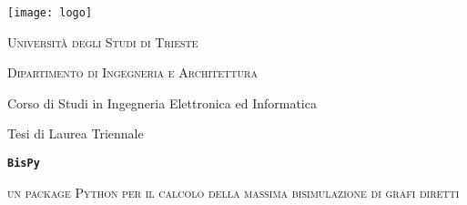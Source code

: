 \documentclass[11pt]{article}
\begin{document}
\begin{titlepage}
  \begin{center}
      \vspace{-2cm}
      \texttt{[image: logo]}

      \vspace{1.5cm}

      \Large
      \textsc{Università degli Studi di Trieste}
      \makebox[\textwidth][c]{\rule{\textwidth}{.4pt}}

      \textsc{Dipartimento di Ingegneria e Architettura}

      \vspace{0.5cm}
      Corso di Studi in Ingegneria Elettronica ed Informatica

      \vspace{1.5cm}

      Tesi di Laurea Triennale

      \vspace{1.5cm}

      \makebox[\textwidth][c]{\rule{\textwidth}{.4pt}}
      \Large
      \textbf{\texttt{BisPy}}

      \large
      \textsc{un package Python per il calcolo della massima bisimulazione di grafi diretti}
      \makebox[\textwidth][c]{\rule{\textwidth}{.4pt}}
      \vspace{1.5cm}

      \vfill

  \end{center}
\end{titlepage}

\renewcommand\contentsname{Indice}
\tableofcontents
{}


\clearpage

\clearpage

\clearpage

\clearpage

\clearpage

\renewcommand\refname{Bibliografia}


\end{document}
